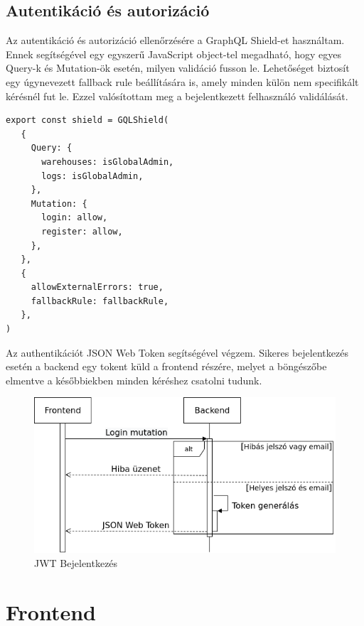 \subsection{Autentikáció és autorizáció}
Az autentikáció és autorizáció ellenőrzésére a GraphQL Shield-et használtam. 
Ennek segítségével egy egyszerű JavaScript object-tel megadható, hogy egyes Query-k és Mutation-ök esetén, milyen validáció fusson le.
Lehetőséget biztosít egy úgynevezett fallback rule beállítására is, amely minden külön nem specifikált kérésnél fut le.
Ezzel valósítottam meg a bejelentkezett felhasználó validálását.

\begin{lstlisting}[style=ES6, caption={GraphQL Shield}]
export const shield = GQLShield(
   {
     Query: {
       warehouses: isGlobalAdmin,
       logs: isGlobalAdmin,
     },
     Mutation: {
       login: allow,
       register: allow,
     },
   },
   {
     allowExternalErrors: true,
     fallbackRule: fallbackRule,
   },
)
\end{lstlisting}

Az authentikációt JSON Web Token segítségével végzem. 
Sikeres bejelentkezés esetén a backend egy tokent küld a frontend részére, melyet a böngészőbe elmentve a későbbiekben minden kéréshez csatolni tudunk.

\begin{figure}[!ht]
  \centering
  \includegraphics[width=150mm, keepaspectratio]{figures/login.png}
  \caption{JWT Bejelentkezés}
  \label{fig:JWT}
\end{figure}


\section{Frontend}

